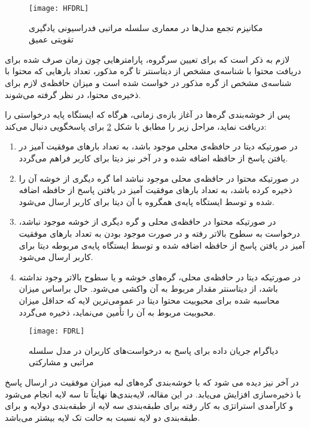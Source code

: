 \begin{figure}[ht]
	\centerline{\texttt{[image: HFDRL]}}
	\caption{مکانیزم تجمع مدل‌ها در معماری سلسله مراتبی فدراسیونی یادگیری تقویتی عمیق}
	\label{fig:hfdrl}
\end{figure}

 لازم به ذکر است که برای تعیین سرگروه، پارامترهایی چون زمان صرف شده برای دریافت محتوا با شناسه‌ی مشخص از دیتاسنتر تا گره مذکور، تعداد بارهایی که محتوا با شناسه‌ی مشخص از گره مذکور در خواست شده است و میزان حافظه‌ی لازم برای ذخیره‌ی محتوا، در نظر گرفته می‌شوند.
 
 پس از خوشه‌بندی گره‌ها در آغاز بازه‌ی زمانی،‌ هرگاه که ایستگاه پایه درخواستی را دریافت نماید، مراحل زیر را مطابق با شکل \ref{fig:fdrl} برای پاسخگویی دنبال می‌کند:
 \begin{enumerate}
 	\item 
 	در صورتیکه دیتا در حافظه‌ی محلی موجود باشد، به تعداد بارهای موفقیت آمیز در یافتن پاسخ از حافظه اضافه شده و در آخر نیز دیتا برای کاربر فراهم می‌گردد.
 	\item 
 	در صورتیکه محتوا در حافظه‌ی محلی موجود نباشد اما گره دیگری از خوشه آن را ذخیره کرده باشد، به تعداد بارهای موفقیت آمیز در یافتن پاسخ از حافظه اضافه شده و توسط ایستگاه پایه‌ی همگروه با آن دیتا برای کاربر ارسال می‌شود.
 	\item 
 	در صورتیکه محتوا در حافظه‌ی محلی و گره دیگری از خوشه موجود نباشد، درخواست به سطوح بالاتر رفته و در صورت موجود بودن به تعداد بارهای موفقیت آمیز در یافتن پاسخ از حافظه اضافه شده و توسط ایستگاه پایه‌ی مربوطه دیتا برای کاربر ارسال می‌شود.
 	\item 
 	در صورتیکه دیتا در حافظه‌ی محلی،‌ گره‌های خوشه و یا سطوح بالاتر وجود نداشته باشد، از دیتاسنتر مقدار مربوط به آن واکشی می‌شود. حال براساس میزان محاسبه شده برای محبوبیت محتوا دیتا در عمومی‌ترین لایه که حداقل میزان محبوبیت مربوط به آن را تأمین می‌نماید، ذخیره می‌گردد. 
 \end{enumerate}

\begin{figure}[ht]
	\centerline{\texttt{[image: FDRL]}}
	\caption{دیاگرام جریان داده برای پاسخ به درخواست‌های کاربران در مدل سلسله مراتبی و مشارکتی}
	\label{fig:fdrl}
\end{figure}

در آخر نیز دیده می شود که با خوشه‌بندی گره‌های لبه میزان موفقیت در ارسال پاسخ با ذخیره‌سازی افزایش می‌یابد. در این مقاله، لایه‌بندی‌ها نهایتاً تا سه لایه انجام می‌شود و کارآمدی استراتژی به کار رفته برای طبقه‌بندی سه لایه از طبقه‌بندی دولایه و برای طبقه‌بندی دو لایه نسبت به حالت تک لایه بیشتر می‌باشد.


